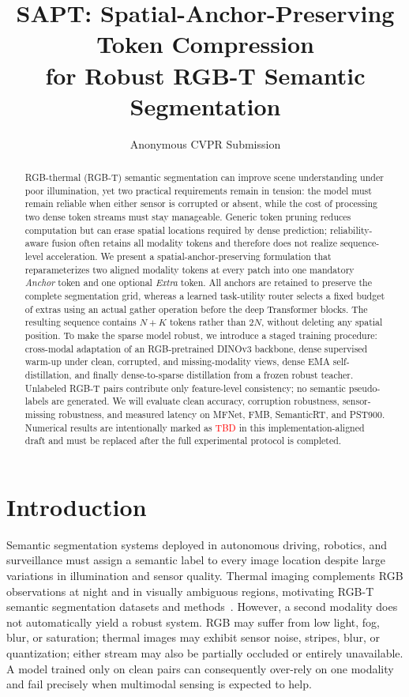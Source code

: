 \documentclass[10pt,twocolumn,letterpaper]{article}
\title{SAPT: Spatial-Anchor-Preserving Token Compression\\
for Robust RGB-T Semantic Segmentation}
\author{Anonymous CVPR Submission}
\newcommand{\tbd}{\textcolor{red}{TBD}}
\begin{document}
\maketitle

\begin{abstract}
RGB-thermal (RGB-T) semantic segmentation can improve scene understanding under poor illumination, yet two practical requirements remain in tension: the model must remain reliable when either sensor is corrupted or absent, while the cost of processing two dense token streams must stay manageable.
Generic token pruning reduces computation but can erase spatial locations required by dense prediction; reliability-aware fusion often retains all modality tokens and therefore does not realize sequence-level acceleration.
We present a spatial-anchor-preserving formulation that reparameterizes two aligned modality tokens at every patch into one mandatory \emph{Anchor} token and one optional \emph{Extra} token.
All anchors are retained to preserve the complete segmentation grid, whereas a learned task-utility router selects a fixed budget of extras using an actual gather operation before the deep Transformer blocks.
The resulting sequence contains $N+K$ tokens rather than $2N$, without deleting any spatial position.
To make the sparse model robust, we introduce a staged training procedure: cross-modal adaptation of an RGB-pretrained DINOv3 backbone, dense supervised warm-up under clean, corrupted, and missing-modality views, dense EMA self-distillation, and finally dense-to-sparse distillation from a frozen robust teacher.
Unlabeled RGB-T pairs contribute only feature-level consistency; no semantic pseudo-labels are generated.
We will evaluate clean accuracy, corruption robustness, sensor-missing robustness, and measured latency on MFNet, FMB, SemanticRT, and PST900.
Numerical results are intentionally marked as \tbd{} in this implementation-aligned draft and must be replaced after the full experimental protocol is completed.
\end{abstract}

\section{Introduction}
\label{sec:intro}

Semantic segmentation systems deployed in autonomous driving, robotics, and surveillance must assign a semantic label to every image location despite large variations in illumination and sensor quality.
Thermal imaging complements RGB observations at night and in visually ambiguous regions, motivating RGB-T semantic segmentation datasets and methods~\cite{ha2017mfnet,shivakumar2019pst900,ji2023semanticrt,liu2023segmif}.
However, a second modality does not automatically yield a robust system.
RGB may suffer from low light, fog, blur, or saturation; thermal images may exhibit sensor noise, stripes, blur, or quantization; either stream may also be partially occluded or entirely unavailable.
A model trained only on clean pairs can consequently over-rely on one modality and fail precisely when multimodal sensing is expected to help.
\end{document}
